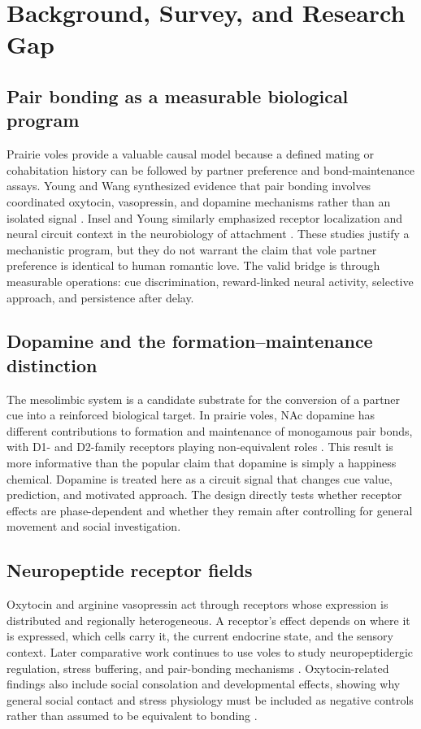 \documentclass[conference]{IEEEtran}
\begin{document}
\section{Background, Survey, and Research Gap}
\subsection{Pair bonding as a measurable biological program}
Prairie voles provide a valuable causal model because a defined mating or cohabitation history can be followed by partner preference and bond-maintenance assays. Young and Wang synthesized evidence that pair bonding involves coordinated oxytocin, vasopressin, and dopamine mechanisms rather than an isolated signal \cite{young2004}. Insel and Young similarly emphasized receptor localization and neural circuit context in the neurobiology of attachment \cite{insel2001}. These studies justify a mechanistic program, but they do not warrant the claim that vole partner preference is identical to human romantic love. The valid bridge is through measurable operations: cue discrimination, reward-linked neural activity, selective approach, and persistence after delay.

\subsection{Dopamine and the formation--maintenance distinction}
The mesolimbic system is a candidate substrate for the conversion of a partner cue into a reinforced biological target. In prairie voles, NAc dopamine has different contributions to formation and maintenance of monogamous pair bonds, with D1- and D2-family receptors playing non-equivalent roles \cite{aragona2006}. This result is more informative than the popular claim that dopamine is simply a happiness chemical. Dopamine is treated here as a circuit signal that changes cue value, prediction, and motivated approach. The design directly tests whether receptor effects are phase-dependent and whether they remain after controlling for general movement and social investigation.

\subsection{Neuropeptide receptor fields}
Oxytocin and arginine vasopressin act through receptors whose expression is distributed and regionally heterogeneous. A receptor's effect depends on where it is expressed, which cells carry it, the current endocrine state, and the sensory context. Later comparative work continues to use voles to study neuropeptidergic regulation, stress buffering, and pair-bonding mechanisms \cite{johnson2015}. Oxytocin-related findings also include social consolation and developmental effects, showing why general social contact and stress physiology must be included as negative controls rather than assumed to be equivalent to bonding \cite{bales2023,burkett2016}.
\end{document}
